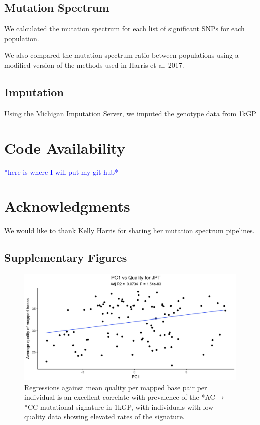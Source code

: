 \documentclass[9pt,lineno]{elife}
\newcommand{\todo}[1]{\textcolor{blue}{*#1*}}
\begin{document}
\subsection{Mutation Spectrum}
We calculated the mutation spectrum for each list of significant SNPs for each population.  

We also compared the mutation spectrum ratio between populations using a modified version of the methods used in Harris et al. 2017. 

\subsection{Imputation}
Using the Michigan Imputation Server, we imputed the genotype data from 1kGP


\section{Code Availability}
\todo{here is where I will put my git hub}

\section{Acknowledgments}
We would like to thank Kelly Harris for sharing her mutation spectrum pipelines.
 
\subsection{Supplementary Figures}
\begin{figure}
\includegraphics[width=\hsize,keepaspectratio]{PC1_Correlation.jpg}
\caption{Regressions against mean quality per mapped base pair per individual is an excellent correlate with prevalence of the  *AC${\rightarrow}$*CC mutational signature in 1kGP, with individuals with low-quality data showing elevated rates of the signature.  }
 \label{PC1_Correlation}
\end{figure}



\end{document}
